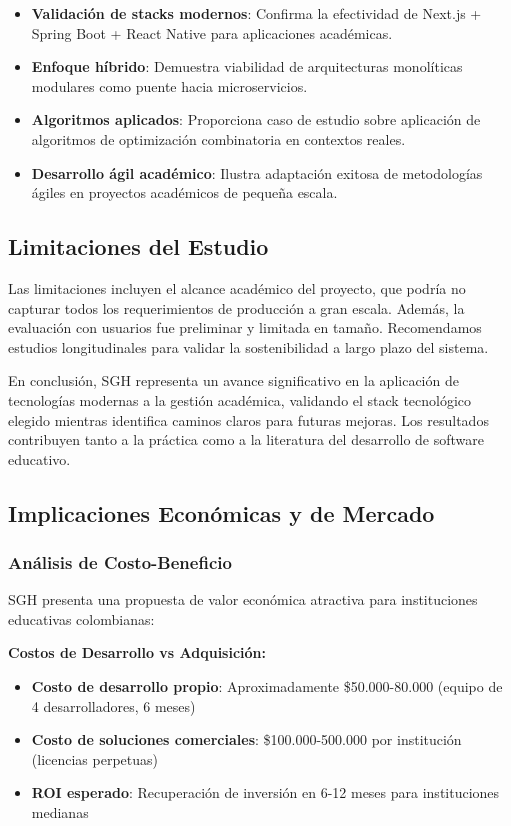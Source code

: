 \begin{itemize}
\item \textbf{Validación de stacks modernos}: Confirma la efectividad de Next.js + Spring Boot + React Native para aplicaciones académicas.
\item \textbf{Enfoque híbrido}: Demuestra viabilidad de arquitecturas monolíticas modulares como puente hacia microservicios.
\item \textbf{Algoritmos aplicados}: Proporciona caso de estudio sobre aplicación de algoritmos de optimización combinatoria en contextos reales.
\item \textbf{Desarrollo ágil académico}: Ilustra adaptación exitosa de metodologías ágiles en proyectos académicos de pequeña escala.
\end{itemize}

\subsection{Limitaciones del Estudio}

Las limitaciones incluyen el alcance académico del proyecto, que podría no capturar todos los requerimientos de producción a gran escala. Además, la evaluación con usuarios fue preliminar y limitada en tamaño. Recomendamos estudios longitudinales para validar la sostenibilidad a largo plazo del sistema.

En conclusión, SGH representa un avance significativo en la aplicación de tecnologías modernas a la gestión académica, validando el stack tecnológico elegido mientras identifica caminos claros para futuras mejoras. Los resultados contribuyen tanto a la práctica como a la literatura del desarrollo de software educativo.

\subsection{Implicaciones Económicas y de Mercado}

\subsubsection{Análisis de Costo-Beneficio}

SGH presenta una propuesta de valor económica atractiva para instituciones educativas colombianas:

\textbf{Costos de Desarrollo vs Adquisición:}
\begin{itemize}
\item \textbf{Costo de desarrollo propio}: Aproximadamente \$50.000-80.000 (equipo de 4 desarrolladores, 6 meses)
\item \textbf{Costo de soluciones comerciales}: \$100.000-500.000 por institución (licencias perpetuas)
\item \textbf{ROI esperado}: Recuperación de inversión en 6-12 meses para instituciones medianas
\end{itemize}

